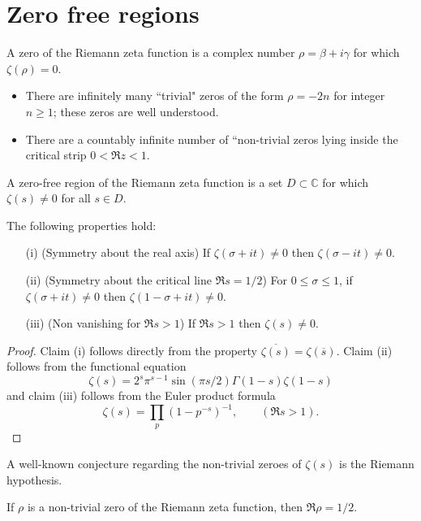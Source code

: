 \chapter{Zero free regions}\label{zerofree-chapter}
A zero of the Riemann zeta function is a complex number $\rho = \beta + i\gamma$ for which $\zeta(\rho) = 0$. 
\begin{itemize}
    \item There are infinitely many ``trivial" zeros of the form $\rho = -2n$ for integer $n \ge 1$; these zeros are well understood.
    \item There are a countably infinite number of ``non-trivial zeros lying inside the critical strip $0 < \Re z < 1$.
\end{itemize}

\begin{definition}\label{zeta-zero-free-def}A zero-free region of the Riemann zeta function is a set $D \subset \mathbb{C}$ for which $\zeta(s) \ne 0$ for all $s \in D$. 
\end{definition}

\begin{lemma}\label{zero-free-basic-lem}
The following properties hold:
\begin{enumerate}
    \item[(i)] (Symmetry about the real axis) If $\zeta(\sigma + it) \ne 0$ then $\zeta(\sigma - it) \ne 0$.
    \item[(ii)] (Symmetry about the critical line $\Re s = 1/2$) For $0 \le \sigma \le 1$, if $\zeta(\sigma + it) \ne 0$ then $\zeta(1 - \sigma + it) \ne 0$.
    \item[(iii)] (Non vanishing for $\Re s > 1$) If $\Re s > 1$ then $\zeta(s) \ne 0$.
\end{enumerate}
\end{lemma}
\begin{proof}
Claim (i) follows directly from the property $\overline{\zeta(s)} = \zeta(\overline{s})$. Claim (ii) follows from the functional equation 
\[
\zeta(s) = 2^s \pi^{s - 1}\sin(\pi s/2) \Gamma(1 -s)\zeta(1-s)
\]
and claim (iii) follows from the Euler product formula
\[
\zeta(s) = \prod_{p}(1 - p^{-s})^{-1},\qquad (\Re s > 1).
\]
\end{proof}

A well-known conjecture regarding the non-trivial zeroes of $\zeta(s)$ is the Riemann hypothesis. 

\begin{conjecture}\label{rh}
If $\rho$ is a non-trivial zero of the Riemann zeta function, then $\Re \rho = 1/2$.
\end{conjecture}


